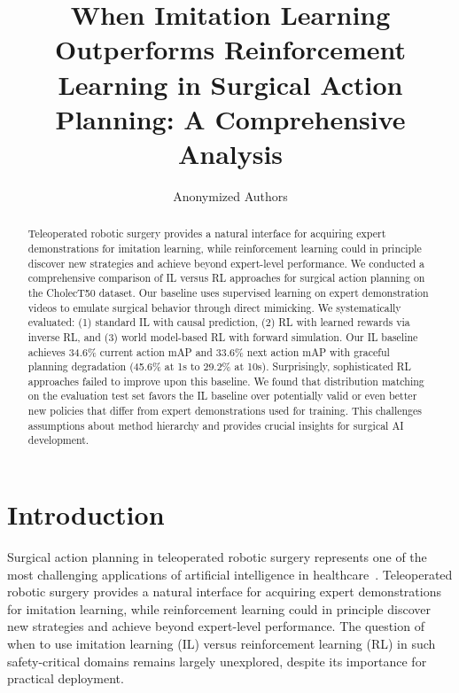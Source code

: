 \documentclass[runningheads]{llncs}
\begin{document}
%
\title{When Imitation Learning Outperforms Reinforcement Learning in Surgical Action Planning: A Comprehensive Analysis}
%
\author{Anonymized Authors}

\maketitle              %
%
\begin{abstract}
Teleoperated robotic surgery provides a natural interface for acquiring expert demonstrations for imitation learning, while reinforcement learning could in principle discover new strategies and achieve beyond expert-level performance. We conducted a comprehensive comparison of IL versus RL approaches for surgical action planning on the CholecT50 dataset. Our baseline uses supervised learning on expert demonstration videos to emulate surgical behavior through direct mimicking. We systematically evaluated: (1) standard IL with causal prediction, (2) RL with learned rewards via inverse RL, and (3) world model-based RL with forward simulation. Our IL baseline achieves 34.6\% current action mAP and 33.6\% next action mAP with graceful planning degradation (45.6\% at 1s to 29.2\% at 10s). Surprisingly, sophisticated RL approaches failed to improve upon this baseline. We found that distribution matching on the evaluation test set favors the IL baseline over potentially valid or even better new policies that differ from expert demonstrations used for training. This challenges assumptions about method hierarchy and provides crucial insights for surgical AI development.

\end{abstract}


\section{Introduction}

Surgical action planning in teleoperated robotic surgery represents one of the most challenging applications of artificial intelligence in healthcare~\cite{nwoye2022cholect50}. Teleoperated robotic surgery provides a natural interface for acquiring expert demonstrations for imitation learning, while reinforcement learning could in principle discover new strategies and achieve beyond expert-level performance. The question of when to use imitation learning (IL) versus reinforcement learning (RL) in such safety-critical domains remains largely unexplored, despite its importance for practical deployment.
\end{document}
